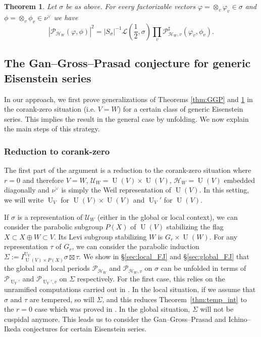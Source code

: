 \documentclass[letterpaper,11pt]{amsart}
\newcommand{\cH}{\mathcal{H}}
\newcommand{\cL}{\mathcal{L}}
\newcommand{\cP}{\mathcal{P}}
\newcommand{\cU}{\mathcal{U}}
\newcommand{\<}{\negthickspace}
\DeclareMathOperator{\U}{U}
\theoremstyle{definition}
\theoremstyle{plain}
\newtheorem{theorem}[definition]{Theorem}
\theoremstyle{remark}
\numberwithin{equation}{section}
\begin{document}
\begin{theorem}
    \label{thm:II}
    Let $\sigma$ be as above. For every factorizable vectors $\varphi =
\otimes_v \varphi_v \in \sigma$ and $\phi=\otimes_v \phi_v \in
\nu^\vee$ we have
    \begin{equation*}
        |\cP_{\cH_W}(\varphi,\phi)|^2=|S_\sigma|^{-1} \cL(\frac{1}{2},\sigma) \prod_v \cP^\sharp_{\cH_W,v}(\varphi_v,\phi_v).
    \end{equation*}
\end{theorem}

\subsection{The Gan--Gross--Prasad conjecture for generic Eisenstein series}

In our approach, we first prove generalizations of Theorems \ref{thm:GGP} and \ref{thm:II} in the corank-zero situation (i.e. $V=W$) for a certain class of generic Eisenstein series. This implies the result in the general case by unfolding. We now explain the main steps of this strategy.

\subsubsection{Reduction to corank-zero}
\label{subsubsec:reduc_zero}

The first part of the argument is a reduction to the corank-zero situation where $r=0$ and therefore $V=W$, $\cU_W=\U(V) \times \U(V)$, $\cH_W=\U(V)$ embedded diagonally and $\nu^\vee$ is simply the Weil representation of $\U(V)$. In this setting, we will write $\U_V$ for $\U(V) \times \U(V)$ and $\U_V'$ for $\U(V)$. 

If $\sigma$ is a representation of $\cU_W$ (either in the global or local context), we can consider the parabolic subgroup $P(X)$ of $\U(V)$ stabilizing the flag $X \subset X \oplus W \subset V$. Its Levi subgroup stabilizing $W$ is $G_r \times \U(W)$. For any representation $\tau$ of $G_r$, we can consider the parabolic induction $\Sigma:=I_{\U(V) \times P(X)}^{\U_V} \sigma \boxtimes \tau$. We show in \S\ref{sec:local_FJ} and \S\ref{sec:global_FJ} that the global and local periods $\cP_{\cH_W}$ and $\cP_{\cH_W,v}$ on $\sigma$ can be unfolded in terms of $\cP_{\U_V'}$ and $\cP_{\U_V',v}$ on $\Sigma$ respectively. For the first case, this relies on the unramified computations carried out in \cite{Boi}. In the local situation, if we assume that $\sigma$ and $\tau$ are tempered, so will $\Sigma$, and this reduces Theorem~\ref{thm:temp_int} to the $r=0$ case which was proved in \cite{Xue2}. In the global situation, $\Sigma$ will not be cuspidal anymore. This leads us to consider the Gan--Gross--Prasad and Ichino--Ikeda conjectures for certain Eisenstein series. 
\end{document}
